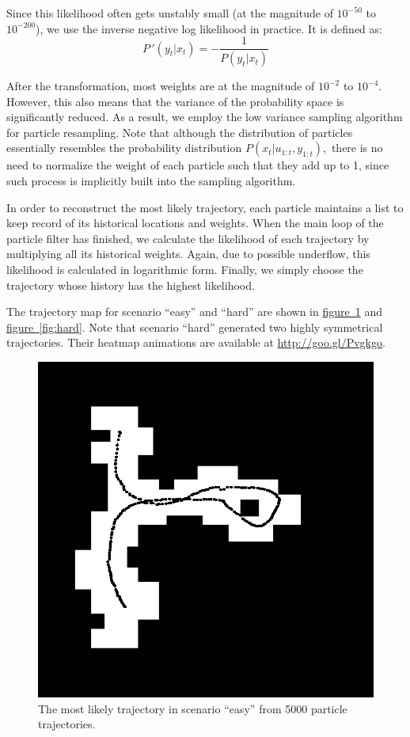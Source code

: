 \documentclass[11pt, a4paper]{article}
\begin{document}
Since this likelihood often gets unstably small (at the magnitude of $10^{-50}$ to $10^{-200}$), we use the inverse negative log likelihood in practice. It is defined as:
\[P\,'(y_t|x_t)=-\frac{1}{P(y_t|x_t)}\]

After the transformation, most weights are at the magnitude of $10^{-2}$ to $10^{-4}.$ However, this also means that the variance of the probability space is significantly reduced. As a result, we employ the low variance sampling algorithm for particle resampling. Note that although the distribution of particles essentially resembles the probability distribution $P(x_t|u_{1:t}, y_{1:t}),$ there is no need to normalize the weight of each particle such that they add up to 1, since such process is implicitly built into the sampling algorithm.

In order to reconstruct the most likely trajectory, each particle maintains a list to keep record of its historical locations and weights. When the main loop of the particle filter has finished, we calculate the likelihood of each trajectory by multiplying all its historical weights. Again, due to possible underflow, this likelihood is calculated in logarithmic form. Finally, we simply choose the trajectory whose history has the highest likelihood.

The trajectory map for scenario ``easy'' and ``hard'' are shown in \hyperref[fig:easy]{figure~\ref{fig:easy}} and \hyperref[fig:hard]{figure~\ref{fig:hard}}. Note that scenario ``hard'' generated two highly symmetrical trajectories. Their heatmap animations are available at \url{http://goo.gl/Pvgkgo}.

\begin{figure}[htbp]
\centering
\includegraphics[scale=0.4]{easy.png}
\caption{The most likely trajectory in scenario ``easy'' from 5000 particle trajectories.}
\label{fig:easy}
\end{figure}
\end{document}
